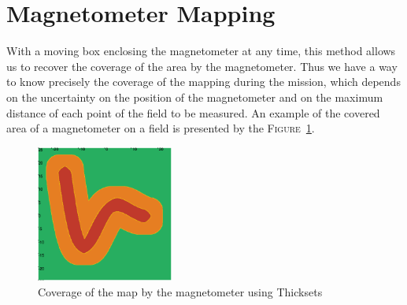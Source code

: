 \section*{Magnetometer Mapping}
    With a moving box enclosing the magnetometer at any time, this method allows us to recover the coverage of the area by the magnetometer. Thus we have a way to know precisely the coverage of the mapping during the mission, which depends on the uncertainty on the position of the magnetometer and on the maximum distance of each point of the field to be measured. An example of the covered area of a magnetometer on a field is presented by the \textsc{Figure}~\ref{fig:thickset_trajectory}.

    \begin{figure}[!htb]
        \centering
        \includegraphics[width=0.4\textwidth]{imgs/thickset_fine_cmap.png}
        \caption{\label{fig:thickset_trajectory} Coverage of the map by the magnetometer using Thicksets}
    \end{figure}
    
    